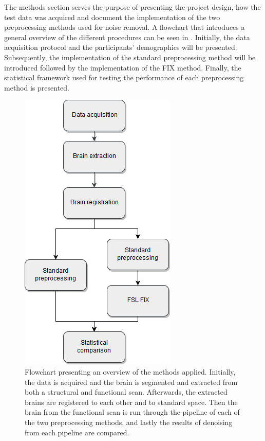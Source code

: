 
The methods section serves the purpose of presenting the project design, how the test data was acquired and document the implementation of the two preprocessing methods used for noise removal. A flowchart that introduces a general overview of the different procedures can be seen in . Initially, the data acquisition protocol and the participants' demographics will be presented. Subsequently, the implementation of the standard preprocessing method will be introduced followed by the implementation of the FIX method. Finally, the statistical framework used for testing the performance of each preprocessing method is presented. 

\begin{figure}[H]                 
	\includegraphics[width=.37\textwidth]{figures/bMethods/Flowchart_intro}  
	\caption{Flowchart presenting an overview of the methods applied. Initially, the data is acquired and the brain is segmented and extracted from both a structural and functional scan. Afterwards, the extracted brains are registered to each other and to standard space. Then the brain from the functional scan is run through the pipeline of each of the two preprocessing methods, and lastly the results of denoising from each pipeline are compared.}
	\label{fig:meth:overview} 
\end{figure}
 